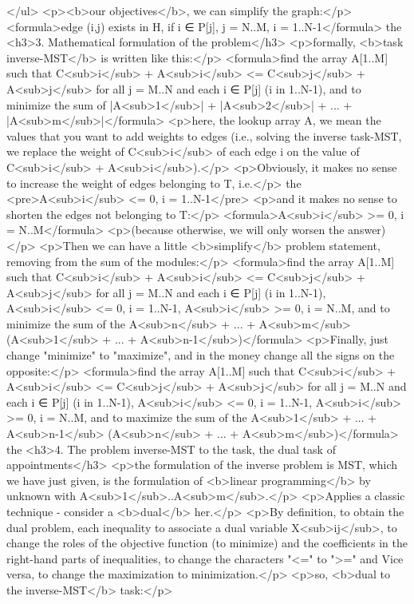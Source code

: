 </ul>
<p><b>our objectives</b>, we can simplify the graph:</p>
<formula>edge (i,j) exists in H, if i ∈ P[j], j = N..M, i = 1..N-1</formula>
the <h3>3. Mathematical formulation of the problem</h3>
<p>formally, <b>task inverse-MST</b> is written like this:</p>
<formula>find the array A[1..M] such that
C<sub>i</sub> + A<sub>i</sub> <= C<sub>j</sub> + A<sub>j</sub> for all j = M..N and each i ∈ P[j] (i in 1..N-1),
and to minimize the sum of |A<sub>1</sub>| + |A<sub>2</sub>| + ... + |A<sub>m</sub>|</formula>
<p>here, the lookup array A, we mean the values that you want to add weights to edges (i.e., solving the inverse task-MST, we replace the weight of C<sub>i</sub> of each edge i on the value of C<sub>i</sub> + A<sub>i</sub>).</p>
<p>Obviously, it makes no sense to increase the weight of edges belonging to T, i.e.</p>
the <pre>A<sub>i</sub> <= 0, i = 1..N-1</pre>
<p>and it makes no sense to shorten the edges not belonging to T:</p>
<formula>A<sub>i</sub> >= 0, i = N..M</formula>
<p>(because otherwise, we will only worsen the answer)</p>
<p>Then we can have a little <b>simplify</b> problem statement, removing from the sum of the modules:</p>
<formula>find the array A[1..M] such that
C<sub>i</sub> + A<sub>i</sub> <= C<sub>j</sub> + A<sub>j</sub> for all j = M..N and each i ∈ P[j] (i in 1..N-1),
A<sub>i</sub> <= 0, i = 1..N-1,
A<sub>i</sub> >= 0, i = N..M,
and to minimize the sum of the A<sub>n</sub> + ... + A<sub>m</sub> (A<sub>1</sub> + ... + A<sub>n-1</sub>)</formula>
<p>Finally, just change "minimize" to "maximize", and in the money change all the signs on the opposite:</p>
<formula>find the array A[1..M] such that
C<sub>i</sub> + A<sub>i</sub> <= C<sub>j</sub> + A<sub>j</sub> for all j = M..N and each i ∈ P[j] (i in 1..N-1),
A<sub>i</sub> <= 0, i = 1..N-1,
A<sub>i</sub> >= 0, i = N..M,
and to maximize the sum of the A<sub>1</sub> + ... + A<sub>n-1</sub> (A<sub>n</sub> + ... + A<sub>m</sub>)</formula>
the <h3>4. The problem inverse-MST to the task, the dual task of appointments</h3>
<p>the formulation of the inverse problem is MST, which we have just given, is the formulation of <b>linear programming</b> by unknown with A<sub>1</sub>..A<sub>m</sub>.</p>
<p>Applies a classic technique - consider a <b>dual</b> her.</p>
<p>By definition, to obtain the dual problem, each inequality to associate a dual variable X<sub>ij</sub>, to change the roles of the objective function (to minimize) and the coefficients in the right-hand parts of inequalities, to change the characters "<=" to ">=" and Vice versa, to change the maximization to minimization.</p>
<p>so, <b>dual to the inverse-MST</b> task:</p>
